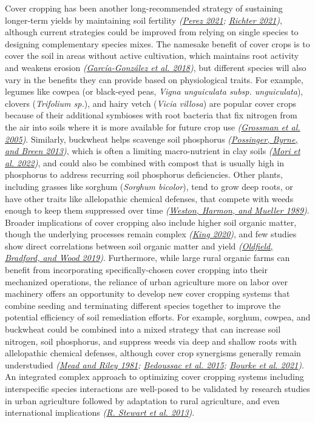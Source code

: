 \documentclass[
  12pt,
]{article}
\begin{document}
Cover cropping has been another long-recommended strategy of sustaining longer-term yields by maintaining soil fertility \emph{(\protect\hyperlink{ref-perez21}{Perez 2021}; \protect\hyperlink{ref-richter21}{Richter 2021})}, although current strategies could be improved from relying on single species to designing complementary species mixes.
The namesake benefit of cover crops is to cover the soil in areas without active cultivation, which maintains root activity and weakens erosion \emph{(\protect\hyperlink{ref-garcia-gonzalez18}{García-González et al. 2018})}, but different species will also vary in the benefits they can provide based on physiological traits.
For example, legumes like cowpea (or black-eyed peas, \emph{Vigna unguiculata subsp. unguiculata}), clovers (\emph{Trifolium sp.}), and hairy vetch (\emph{Vicia villosa}) are popular cover crops because of their additional symbioses with root bacteria that fix nitrogen from the air into soils where it is more available for future crop use \emph{(\protect\hyperlink{ref-grossman05}{Grossman et al. 2005})}.
Similarly, buckwheat helps scavenge soil phosphorus \emph{(\protect\hyperlink{ref-possinger13}{Possinger, Byrne, and Breen 2013})}, which is often a limiting macro-nutrient in clay soils \emph{(\protect\hyperlink{ref-mori22}{Mori et al. 2022})}, and could also be combined with compost that is usually high in phosphorus to address recurring soil phosphorus deficiencies.
Other plants, including grasses like sorghum (\emph{Sorghum bicolor}), tend to grow deep roots, or have other traits like allelopathic chemical defenses, that compete with weeds enough to keep them suppressed over time \emph{(\protect\hyperlink{ref-weston89}{Weston, Harmon, and Mueller 1989})}.
Broader implications of cover cropping also include higher soil organic matter, though the underlying processes remain complex \emph{(\protect\hyperlink{ref-king20}{King 2020})}, and few studies show direct correlations between soil organic matter and yield \emph{(\protect\hyperlink{ref-oldfield19}{Oldfield, Bradford, and Wood 2019})}.
Furthermore, while large rural organic farms can benefit from incorporating specifically-chosen cover cropping into their mechanized operations, the reliance of urban agriculture more on labor over machinery offers an opportunity to develop new cover cropping systems that combine seeding and terminating different species together to improve the potential efficiency of soil remediation efforts.
For example, sorghum, cowpea, and buckwheat could be combined into a mixed strategy that can increase soil nitrogen, soil phosphorus, and suppress weeds via deep and shallow roots with allelopathic chemical defenses, although cover crop synergisms generally remain understudied \emph{(\protect\hyperlink{ref-mead81}{Mead and Riley 1981}; \protect\hyperlink{ref-bedoussac15}{Bedoussac et al. 2015}; \protect\hyperlink{ref-bourke21}{Bourke et al. 2021})}.
An integrated complex approach to optimizing cover cropping systems including interspecific species interactions are well-posed to be validated by research studies in urban agriculture followed by adaptation to rural agriculture, and even international implications \emph{(\protect\hyperlink{ref-stewart13}{R. Stewart et al. 2013})}.
\end{document}
